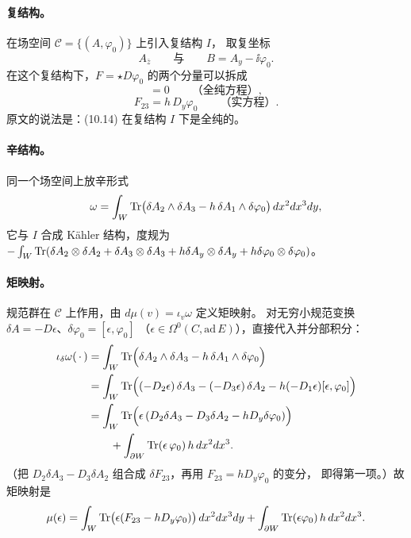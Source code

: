 \paragraph{复结构。}在场空间 $\mathcal{C}=\{(A,\varphi_0)\}$ 上引入复结构 $I$，
取复坐标
\begin{equation}
A_{\bar z}\qquad\text{与}\qquad B=A_y-\ii\varphi_0.
\label{eq:cplxcoord}
\end{equation}
在这个复结构下，$F=\star D\varphi_0$ 的两个分量可以拆成
\begin{equation}
[D_y-\ii\varphi_0,\ D_{\bar z}]=0
\qquad\text{（全纯方程）},
\label{eq:holo}
\end{equation}
\begin{equation}
F_{23}=h\,D_y\varphi_0
\qquad\text{（实方程）}.
\label{eq:real}
\end{equation}
原文的说法是：(10.14) 在复结构 $I$ 下是全纯的。\pA{}

\paragraph{辛结构。}同一个场空间上放辛形式
\begin{equation}
\omega=\int_W\operatorname{Tr}\bigl(\delta A_2\wedge\delta A_3-h\,\delta A_1\wedge\delta\varphi_0\bigr)
\,dx^2dx^3dy,
\label{eq:omega}
\end{equation}
它与 $I$ 合成 Kähler 结构，度规为
$-\int_W\operatorname{Tr}(\delta A_2\otimes\delta A_2+\delta A_3\otimes\delta A_3
+h\delta A_y\otimes\delta A_y+h\delta\varphi_0\otimes\delta\varphi_0)$。
\pA{}

\paragraph{矩映射。}规范群在 $\mathcal{C}$ 上作用，由 $d\mu(v)=\iota_v\omega$ 定义矩映射。
对无穷小规范变换 $\delta A=-D\epsilon$、$\delta\varphi_0=[\epsilon,\varphi_0]$
（$\epsilon\in\Omega^0(C,\mathrm{ad}\,E)$），直接代入并分部积分：
\begin{align}
\iota_{\delta}\omega(\,\cdot\,)
&=\int_W\operatorname{Tr}\Bigl(\delta A_2\wedge\delta A_3-h\,\delta A_1\wedge\delta\varphi_0\Bigr)\notag\\
&=\int_W\operatorname{Tr}\Bigl((-D_2\epsilon)\,\delta A_3-(-D_3\epsilon)\,\delta A_2
-h(-D_1\epsilon)[\epsilon,\varphi_0]\Bigr)\notag\\
&=\int_W\operatorname{Tr}\Bigl(\epsilon\,(D_2\delta A_3-D_3\delta A_2-hD_y\delta\varphi_0)\Bigr)
\notag\\
&\qquad+\int_{\partial W}\operatorname{Tr}(\epsilon\,\varphi_0)\,h\,dx^2dx^3 .
\label{eq:moment}
\end{align}
（把 $D_2\delta A_3-D_3\delta A_2$ 组合成 $\delta F_{23}$，再用 $F_{23}=hD_y\varphi_0$ 的变分，
即得第一项。）故矩映射是
\begin{equation}
\mu(\epsilon)=\int_W\operatorname{Tr}\bigl(\epsilon(F_{23}-hD_y\varphi_0)\bigr)\,dx^2dx^3dy
+\int_{\partial W}\operatorname{Tr}(\epsilon\varphi_0)\,h\,dx^2dx^3 .
\label{eq:momentmap}
\end{equation}
\pA{}

